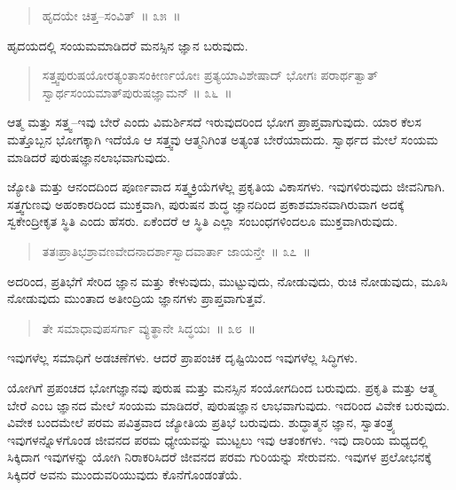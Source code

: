 \vspace{-0.3cm}

\begin{verse}
ಹೃದಯೇ ಚಿತ್ತ–ಸಂವಿತ್​~॥ ೩೫~॥
\end{verse}

\vspace{-0.3cm}

ಹೃದಯದಲ್ಲಿ ಸಂಯಮಮಾಡಿದರೆ ಮನಸ್ಸಿನ ಜ್ಞಾನ ಬರುವುದು. 

\vspace{-0.3cm}

\begin{verse}
ಸತ್ತ್ವಪುರುಷಯೋರತ್ಯಂತಾಸಂಕೀರ್ಣಯೋಃ ಪ್ರತ್ಯಯಾವಿಶೇಷಾದ್​ ಭೋಗಃ ಪರಾರ್ಥತ್ವಾತ್​ ಸ್ವಾರ್ಥಸಂಯಮಾತ್​ ಪುರುಷಜ್ಞಾಮನ್​ \hfill{॥ ೩೬~॥}
\end{verse}

\vspace{-0.3cm}

ಆತ್ಮ ಮತ್ತು ಸತ್ತ್ವ–ಇವು ಬೇರೆ ಎಂದು ವಿಮರ್ಶಿಸದೆ ಇರುವುದರಿಂದ ಭೋಗ ಪ್ರಾಪ್ತವಾಗುವುದು. ಯಾರ ಕೆಲಸ ಮತ್ತೊಬ್ಬನ ಭೋಗಕ್ಕಾಗಿ ಇದೆಯೊ ಆ ಸತ್ತ್ವವು ಆತ್ಮನಿಗಿಂತ ಅತ್ಯಂತ ಬೇರೆಯಾದುದು. ಸ್ವಾರ್ಥದ ಮೇಲೆ ಸಂಯಮ ಮಾಡಿದರೆ ಪುರುಷಜ್ಞಾನಲಾಭವಾಗುವುದು. 

ಜ್ಯೋತಿ ಮತ್ತು ಆನಂದದಿಂದ ಪೂರ್ಣವಾದ ಸತ್ತ್ವಕ್ರಿಯೆಗಳೆಲ್ಲ ಪ್ರಕೃತಿಯ ವಿಕಾಸಗಳು. ಇವುಗಳಿರುವುದು ಜೀವನಿಗಾಗಿ. ಸತ್ತ್ವಗುಣವು ಅಹಂಕಾರದಿಂದ ಮುಕ್ತವಾಗಿ, ಪುರುಷನ ಶುದ್ಧ ಜ್ಞಾನದಿಂದ ಪ್ರಕಾಶಮಾನವಾಗಿರುವಾಗ ಅದಕ್ಕೆ ಸ್ವಕೇಂದ್ರೀಕೃತ ಸ್ಥಿತಿ ಎಂದು ಹೆಸರು. ಏಕೆಂದರೆ ಆ ಸ್ಥಿತಿ ಎಲ್ಲಾ ಸಂಬಂಧಗಳಿಂದಲೂ ಮುಕ್ತವಾಗಿರುವುದು. 

\vspace{-0.3cm}

\begin{verse}
ತತಃಪ್ರಾತಿಭಶ್ರಾವಣವೇದನಾದರ್ಶಾಸ್ವಾದವಾರ್ತಾ ಜಾಯನ್ತೇ~॥ ೩೭~॥
\end{verse}

\vspace{-0.3cm}

ಅದರಿಂದ, ಪ್ರತಿಭೆಗೆ ಸೇರಿದ ಜ್ಞಾನ ಮತ್ತು ಕೇಳುವುದು, ಮುಟ್ಟುವುದು, ನೋಡುವುದು, ರುಚಿ ನೋಡುವುದು, ಮೂಸಿ ನೋಡುವುದು ಮುಂತಾದ ಅತೀಂದ್ರಿಯ ಜ್ಞಾನಗಳು ಪ್ರಾಪ್ತವಾಗುತ್ತವೆ. 

\vspace{-0.3cm}

\begin{verse}
ತೇ ಸಮಾಧಾವುಪಸರ್ಗಾ ವ್ಯುತ್ಥಾನೇ ಸಿದ್ಧಯಃ~॥ ೩೮~॥
\end{verse}

\vspace{-0.3cm}

ಇವುಗಳೆಲ್ಲ ಸಮಾಧಿಗೆ ಅಡಚಣೆಗಳು. ಆದರೆ ಪ್ರಾಪಂಚಿಕ ದೃಷ್ಟಿಯಿಂದ ಇವುಗಳೆಲ್ಲ ಸಿದ್ಧಿಗಳು. 

ಯೋಗಿಗೆ ಪ್ರಪಂಚದ ಭೋಗಜ್ಞಾನವು ಪುರುಷ ಮತ್ತು ಮನಸ್ಸಿನ ಸಂಯೋಗದಿಂದ ಬರುವುದು. ಪ್ರಕೃತಿ ಮತ್ತು ಆತ್ಮ ಬೇರೆ ಎಂಬ ಜ್ಞಾನದ ಮೇಲೆ ಸಂಯಮ ಮಾಡಿದರೆ, ಪುರುಷಜ್ಞಾನ ಲಾಭವಾಗುವುದು. ಇದರಿಂದ ವಿವೇಕ ಬರುವುದು. ವಿವೇಕ ಬಂದಮೇಲೆ ಪರಮ ಪವಿತ್ರವಾದ ಜ್ಯೋತಿಯ ಪ್ರತಿಭೆ ಬರುವುದು. ಶುದ್ಧಾತ್ಮನ ಜ್ಞಾನ, ಸ್ವಾತಂತ್ರ್ಯ ಇವುಗಳನ್ನೊಳಗೊಂಡ ಜೀವನದ ಪರಮ ಧ್ಯೇಯವನ್ನು ಮುಟ್ಟಲು ಇವು ಆತಂಕಗಳು. ಇವು ದಾರಿಯ ಮಧ್ಯದಲ್ಲಿ ಸಿಕ್ಕಿದಾಗ ಇವುಗಳನ್ನು ಯೋಗಿ ನಿರಾಕರಿಸಿದರೆ ಜೀವನದ ಪರಮ ಗುರಿಯನ್ನು ಸೇರುವನು. ಇವುಗಳ ಪ್ರಲೋಭನಕ್ಕೆ ಸಿಕ್ಕಿದರೆ ಅವನು ಮುಂದುವರಿಯುವುದು ಕೊನೆಗೊಂಡಂತೆಯೆ. 

